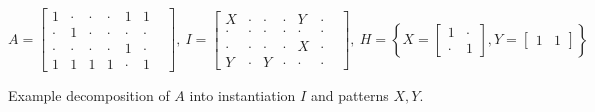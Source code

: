 \vspace{-.1cm}
\small
$$
A =
\begin{bmatrix}
1 & \cdot & \cdot & \cdot & 1 & 1 &  \\[-.5em]
\cdot & 1 & \cdot & \cdot & \cdot & \cdot &  \\[-.5em]
\cdot & \cdot & \cdot & \cdot & 1 & \cdot &  \\[-.5em]
1 & 1 & 1 & 1 & \cdot & 1
\end{bmatrix}\!\!, \
I = 
\begin{bmatrix}
X & \cdot & \cdot & \cdot & Y & \cdot & \\[-.5em]
\cdot & \cdot & \cdot & \cdot & \cdot & \cdot &  \\[-.5em]
\cdot & \cdot & \cdot & \cdot & X & \cdot &  \\[-.5em]
Y & \cdot & Y & \cdot & \cdot & \cdot
\end{bmatrix}\!\!, \
H = \left\{
X =
\begin{bmatrix}
1 & \cdot \\[-.2em]
\cdot & 1
\end{bmatrix}\!\!,
Y =
\begin{bmatrix}
1 & 1
\end{bmatrix}\right\}
$$\vspace{-.5em}
\caption{Example decomposition of $A$ into instantiation $I$ and patterns $X,Y$.}
